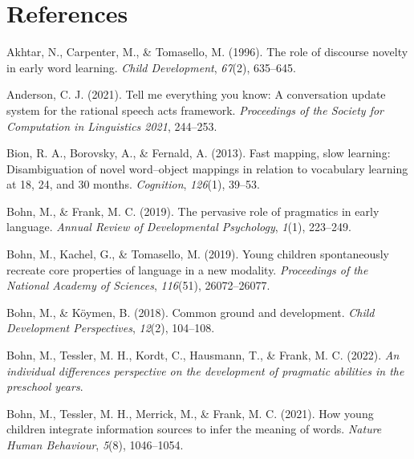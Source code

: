 \documentclass[
  man,floatsintext]{apa6}
\newlength{\cslhangindent}
\newlength{\cslentryspacingunit} %
\newenvironment{CSLReferences}[2] %
 {%
  \setlength{\parindent}{0pt}
  \ifodd #1
  \let\oldpar\par
  \def\par{\hangindent=\cslhangindent\oldpar}
  \fi
  \setlength{\parskip}{#2\cslentryspacingunit}
 }%
 {}
\begin{document}
\hypertarget{references}{%
\section{References}\label{references}}

\begingroup
\setlength{\parindent}{-0.5in}
\setlength{\leftskip}{0.5in}

\hypertarget{refs}{}
\begin{CSLReferences}{1}{0}
\leavevmode{}%
Akhtar, N., Carpenter, M., \& Tomasello, M. (1996). The role of discourse novelty in early word learning. \emph{Child Development}, \emph{67}(2), 635--645.

\leavevmode{}%
Anderson, C. J. (2021). Tell me everything you know: A conversation update system for the rational speech acts framework. \emph{Proceedings of the Society for Computation in Linguistics 2021}, 244--253.

\leavevmode{}%
Bion, R. A., Borovsky, A., \& Fernald, A. (2013). Fast mapping, slow learning: Disambiguation of novel word--object mappings in relation to vocabulary learning at 18, 24, and 30 months. \emph{Cognition}, \emph{126}(1), 39--53.

\leavevmode{}%
Bohn, M., \& Frank, M. C. (2019). The pervasive role of pragmatics in early language. \emph{Annual Review of Developmental Psychology}, \emph{1}(1), 223--249.

\leavevmode{}%
Bohn, M., Kachel, G., \& Tomasello, M. (2019). Young children spontaneously recreate core properties of language in a new modality. \emph{Proceedings of the National Academy of Sciences}, \emph{116}(51), 26072--26077.

\leavevmode{}%
Bohn, M., \& Köymen, B. (2018). Common ground and development. \emph{Child Development Perspectives}, \emph{12}(2), 104--108.

\leavevmode{}%
Bohn, M., Tessler, M. H., Kordt, C., Hausmann, T., \& Frank, M. C. (2022). \emph{An individual differences perspective on the development of pragmatic abilities in the preschool years}.

\leavevmode{}%
Bohn, M., Tessler, M. H., Merrick, M., \& Frank, M. C. (2021). How young children integrate information sources to infer the meaning of words. \emph{Nature Human Behaviour}, \emph{5}(8), 1046--1054.


\end{CSLReferences}
\end{document}
